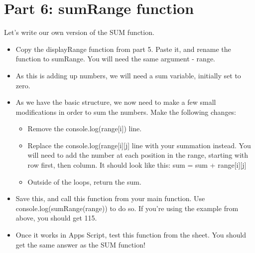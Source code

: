 \documentclass{article}
\begin{document}
\section*{Part 6: sumRange function}
Let's write our own version of the SUM function.
\begin{itemize}
    \item Copy the displayRange function from part 5.  Paste it, and rename the function to sumRange.  You will need the same argument - range.
    \item As this is adding up numbers, we will need a sum variable, initially set to zero.
    \item As we have the basic structure, we now need to make a few small modifications in order to sum the numbers.  Make the following changes:
    \begin{itemize}
    		\item Remove the console.log(range[i]) line.
    		\item Replace the console.log(range[i][j] line with your summation instead.  You will need to add the number at each position in the range, starting with row first, then column.  It should look like this:  sum = sum + range[i][j]
    		\item Outside of the loops, return the sum.
    	\end{itemize}
    	\item Save this, and call this function from your main function.  Use console.log(sumRange(range)) to do so.  If you're using the example from above, you should get 115.
    	\item Once it works in Apps Script, test this function from the sheet.  You should get the same answer as the SUM function!
\end{itemize}
\end{document}
